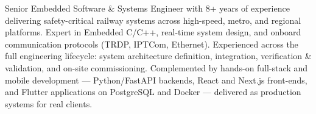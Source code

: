 \par{
	Senior Embedded Software \& Systems Engineer with 8+ years of experience delivering
	safety-critical railway systems across high-speed, metro, and regional platforms. Expert in
	Embedded C/C++, real-time system design, and onboard communication protocols (TRDP, IPTCom,
	Ethernet). Experienced across the full engineering lifecycle: system architecture definition,
	integration, verification \& validation, and on-site commissioning. Complemented by hands-on
	full-stack and mobile development --- Python/FastAPI backends, React and Next.js front-ends,
	and Flutter applications on PostgreSQL and Docker --- delivered as production systems for
	real clients.
}
